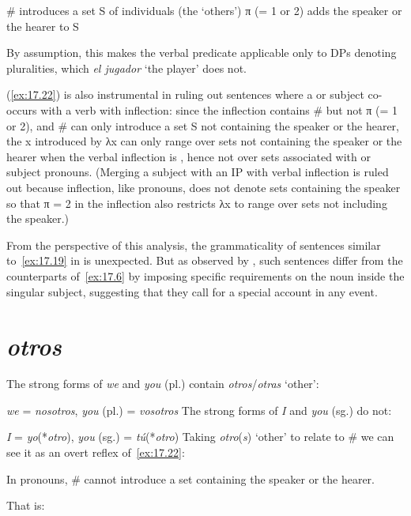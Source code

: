 \documentclass[output=paper]{langsci/langscibook}
\begin{document}
\begin{exe}
\exi{\eqref{ex:17.13}}
\begin{xlist}
     \# introduces a set S of individuals (the ‘others’)
     π (= 1 or 2) adds the speaker or the hearer to S
\end{xlist}
\end{exe}
By assumption, this makes the verbal predicate applicable only to DPs denoting
pluralities, which \emph{el jugador} ‘the player’ does not.

(\ref{ex:17.22}) is also instrumental in ruling out sentences where a \Fpl{}
or \Spl{} subject co-occurs with a verb with \Tpl{} inflection: since the
\Tpl{} inflection contains \# but not π (= 1 or 2), and \# can only introduce
a set S not containing the speaker or the hearer, the x introduced by λx can
only range over sets not containing the speaker or the hearer when the verbal
inflection is \Tpl{}, hence not over sets associated with \Fpl{} or \Spl{}
subject pronouns. (Merging a \Fpl{} subject with an IP with \Spl{} verbal
inflection is ruled out because \Spl{} inflection, like \Spl{} pronouns, does
not denote sets containing the speaker so that π = 2 in the \Spl{} inflection
also restricts λx to range over sets not including the speaker.)

From the perspective of this analysis, the grammaticality of sentences similar
to~\eqref{ex:17.19} in  is unexpected. But as observed by
\textcite{Hoehn2016}, such sentences differ from the  counterparts
of~\eqref{ex:17.6} by imposing specific requirements on the noun inside the
singular subject, suggesting that they call for a special account in any event.

\section{\emph{otros}}\label{sec:17.5}

The strong forms of  \emph{we} and \emph{you} (pl.) contain
\emph{otros}/\emph{otras} ‘other’:

\ea\label{ex:17.24}
    \emph{we} = \emph{nosotros}, \emph{you} (pl.) = \emph{vosotros}
\z
The strong forms of \emph{I} and \emph{you} (sg.) do not:

\ea\label{ex:17.25}
    \emph{I} = \emph{yo}(*\emph{otro}), \emph{you} (sg.) = \emph{tú}(*\emph{otro})
\z
Taking \emph{otro}(\emph{s}) `other' to relate to \# we can see it as an overt
reflex of~\eqref{ex:17.22}:

\begin{exe}
\exi{\eqref{ex:17.22}}
    In pronouns, \# cannot introduce a set containing the speaker or the hearer.
\end{exe}
That is:
\end{document}
